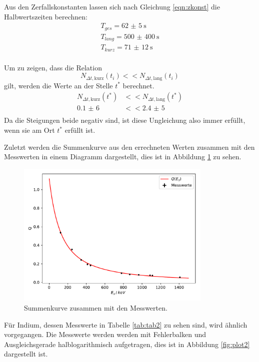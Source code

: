 Aus den Zerfallskonstanten lassen sich nach Gleichung \ref{eqn:zkonst} die Halbwertszeiten berechnen:
\begin{align*}
  T_{ges}=\SI{62(5)}{\s}\\
  T_{lang}=\SI{500(400)}{\s}\\
  T_{kurz}=\SI{71(12)}{\s}\\
\end{align*}

Um zu zeigen, dass die Relation
\begin{equation}
  N_{\Delta t,\text{kurz}}(t_i) <<N_{\Delta t,\text{lang}}(t_i)
\end{equation}
gilt, werden die Werte an der Stelle $t^{*}$ berechnet.
\begin{align}
  N_{\Delta t,\text{kurz}}(t^{*}) &<<N_{\Delta t,\text{lang}}(t^{*})\\
  \SI{0,1(6)}{}&<<\SI{2,4(5)}{}\\
\end{align}
Da die Steigungen beide negativ sind, ist diese Ungleichung also immer erfüllt, wenn sie
am Ort $t^{*}$ erfüllt ist.

Zuletzt werden die Summenkurve aus den errechneten Werten zusammen mit den Messwerten in
einem Diagramm dargestellt, dies ist in Abbildung \ref{fig:plot4} zu sehen.
\begin{figure}[H]
  \centering
  \includegraphics[height=7cm]{plot4.pdf}
  \caption{Summenkurve zusammen mit den Messwerten.}
  \label{fig:plot4}
\end{figure}

Für Indium, dessen Messwerte in Tabelle \ref{tab:tab2} zu sehen sind, wird ähnlich vorgegangen.
Die Messwerte werden werden mit Fehlerbalken und Ausgleichsgerade halblogarithmisch
aufgetragen, dies ist in Abbildung \ref{fig:plot2} dargestellt ist.


